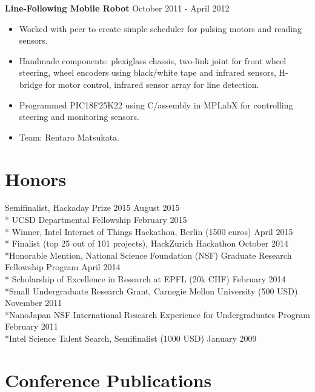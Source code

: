 \documentclass{res}
\begin{document}
    {\bf Line-Following Mobile Robot} \hfill October 2011 - April 2012
\begin{itemize}
    \item Worked with peer to create simple scheduler for pulsing motors and reading sensors.
    \item Handmade components: plexiglass chassis, two-link joint for front wheel steering, wheel encoders using black/white tape and infrared sensors, H-bridge for motor control, infrared sensor array for line detection. 
    \item Programmed PIC18F25K22 using C/assembly in MPLabX for controlling steering and monitoring sensors. 
    \item Team: Rentaro Matsukata.
\end{itemize}








  
\section{Honors}
Semifinalist, Hackaday Prize 2015 \hfill August 2015
\\* UCSD Departmental Fellowship \hfill February 2015
\\* Winner, Intel Internet of Things Hackathon, Berlin (1500 euros) \hfill April 2015
\\* Finalist (top 25 out of 101 projects), HackZurich Hackathon \hfill October 2014
\\*Honorable Mention, National Science Foundation (NSF) Graduate Research Fellowship Program \hfill April 2014
\\* Scholarship of Excellence in Research at EPFL (20k CHF) \hfill February 2014
\\*Small Undergraduate Research Grant, Carnegie Mellon University (500 USD) \hfill November 2011
\\*NanoJapan NSF International Research Experience for Undergraduates Program \hfill February 2011
\\*Intel Science Talent Search, Semifinalist (1000 USD) \hfill January 2009




\vspace{-0.1in}
\section{Conference Publications}
\vspace{0.05in}
\end{document}
